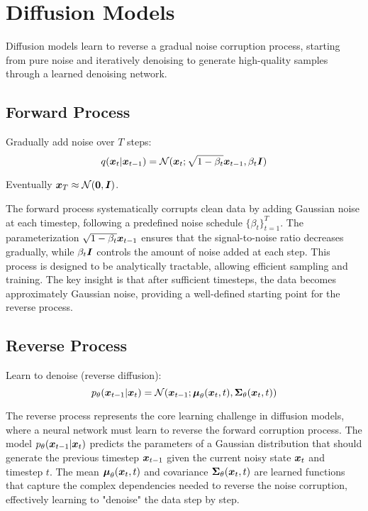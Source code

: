 
\section{Diffusion Models }
\label{sec:diffusion-models}

Diffusion models learn to reverse a gradual noise corruption process, starting from pure noise and iteratively denoising to generate high-quality samples through a learned denoising network.

\subsection{Forward Process}

Gradually add noise over $T$ steps:
\begin{equation}
q(\boldsymbol{x}_t|\boldsymbol{x}_{t-1}) = \mathcal{N}(\boldsymbol{x}_t; \sqrt{1-\beta_t} \boldsymbol{x}_{t-1}, \beta_t \boldsymbol{I})
\end{equation}

Eventually $\boldsymbol{x}_T \approx \mathcal{N}(\boldsymbol{0}, \boldsymbol{I})$.

The forward process systematically corrupts clean data by adding Gaussian noise at each timestep, following a predefined noise schedule $\{\beta_t\}_{t=1}^T$. The parameterization $\sqrt{1-\beta_t} \boldsymbol{x}_{t-1}$ ensures that the signal-to-noise ratio decreases gradually, while $\beta_t \boldsymbol{I}$ controls the amount of noise added at each step. This process is designed to be analytically tractable, allowing efficient sampling and training. The key insight is that after sufficient timesteps, the data becomes approximately Gaussian noise, providing a well-defined starting point for the reverse process.

\subsection{Reverse Process}

Learn to denoise (reverse diffusion):
\begin{equation}
p_{\theta}(\boldsymbol{x}_{t-1}|\boldsymbol{x}_t) = \mathcal{N}(\boldsymbol{x}_{t-1}; \boldsymbol{\mu}_{\theta}(\boldsymbol{x}_t, t), \boldsymbol{\Sigma}_{\theta}(\boldsymbol{x}_t, t))
\end{equation}

The reverse process represents the core learning challenge in diffusion models, where a neural network must learn to reverse the forward corruption process. The model $p_{\theta}(\boldsymbol{x}_{t-1}|\boldsymbol{x}_t)$ predicts the parameters of a Gaussian distribution that should generate the previous timestep $\boldsymbol{x}_{t-1}$ given the current noisy state $\boldsymbol{x}_t$ and timestep $t$. The mean $\boldsymbol{\mu}_{\theta}(\boldsymbol{x}_t, t)$ and covariance $\boldsymbol{\Sigma}_{\theta}(\boldsymbol{x}_t, t)$ are learned functions that capture the complex dependencies needed to reverse the noise corruption, effectively learning to "denoise" the data step by step.

